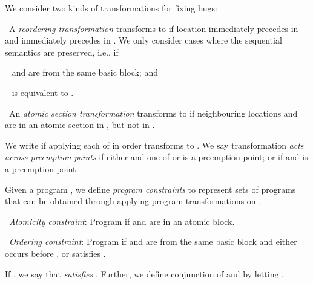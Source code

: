 \documentclass{llncs}
\newcommand\new{\color{red}}
\newcommand\comment[1]{}
\begin{document}
\comment{
\paragraph{Generalizing a program to a partial-program.}
Given a program , we define the preemption-free
semantics-preserving partial-program .
The procedure to compute  is a generalization of the
procedure described in~\cite{cav2013}.
Intuitively, the procedure works as follows: 
\begin{compactitem}
\item The procedure iteratively picks neighbouring statements (say
   and ) and checks for a variable valuation such
  that executing  results in a different result from executing .
  If not,  and  are added to a {\tt reorder} block.
\item The procedure then inserts the largest {\tt atomize} blocks which
  do not contain any {\new {\tt await} statements}.
\end{compactitem}
}

We consider two kinds of transformations for fixing bugs:
\begin{compactitem}
\item~A {\em reordering transformation} 
  transforms  to  if location  immediately precedes
   in  and  immediately precedes  in
  .
  We only consider cases where the sequential semantics
  are preserved, i.e., if
\begin{inparaenum}[(a)]
  \item~ and  are from the same basic block; and
  \item~ is equivalent to .
  \end{inparaenum}
\item~An {\em atomic section transformation} 
  transforms  to  if 
neighbouring locations  and  are in an atomic
  section in , but not in .
\end{compactitem}
We write
 if applying each
of  in order transforms  to .
We say transformation  {\em
acts across preemption-points} if either 
and one of  or  is a preemption-point; or if  and  is a preemption-point.


Given a program , we define {\em program constraints} to
represent sets of programs that can be obtained through
applying program transformations on .
\begin{compactitem}
\item~{\em Atomicity constraint}: Program  if
   and  are in an atomic block.
\item~{\em Ordering constraint}: Program  if  and  are from the same basic block and either
   occurs before , or  satisfies .
\end{compactitem}
If , we say that  {\em satisfies}
.
Further, we define conjunction of  and
 by letting .
\end{document}
